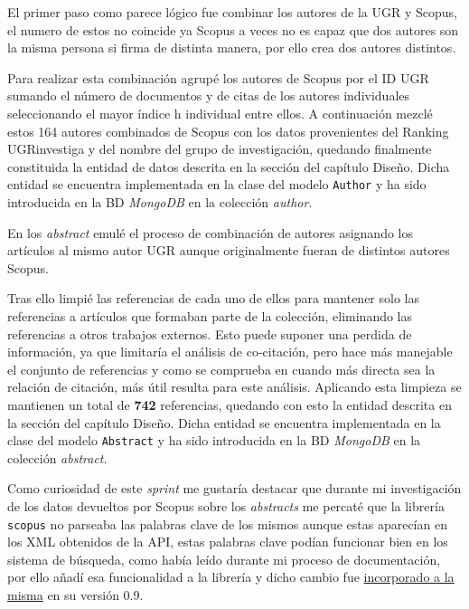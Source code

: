 El primer paso como parece lógico fue combinar los autores de la \acrshort{UGR} y Scopus, el numero de estos no coincide ya Scopus a veces no es capaz que dos autores son la misma persona si firma de distinta manera, por ello crea dos autores distintos.

Para realizar esta combinación agrupé los autores de Scopus por el ID \acrshort{UGR} sumando el número de documentos y de citas de los autores individuales seleccionando el mayor índice h individual entre ellos. A continuación mezclé estos 164 autores combinados de Scopus con los datos provenientes del Ranking UGRinvestiga y del nombre del grupo de investigación, quedando finalmente constituida la entidad de datos descrita en la sección  del capítulo Diseño. Dicha entidad se encuentra implementada en la clase del modelo \texttt{Author} y ha sido introducida en la \acrshort{BD} \textit{MongoDB} en la colección \textit{author}.

En los \textit{abstract} emulé el proceso de combinación de autores asignando los artículos al mismo autor \acrshort{UGR} aunque originalmente fueran de distintos autores Scopus. 

Tras ello limpié las referencias de cada uno de ellos para mantener solo las referencias a artículos que formaban parte de la colección, eliminando las referencias a otros trabajos externos. Esto puede suponer una perdida de información, ya que limitaría el análisis de co-citación, pero hace más manejable el conjunto de referencias y como se comprueba en \cite{DBLP:conf/ecir/SarolLS18} cuando más directa sea la relación de citación, más útil resulta para este análisis. Aplicando esta limpieza se mantienen un total de \textbf{742} referencias, quedando con esto la entidad descrita en la sección  del capítulo Diseño. Dicha entidad se encuentra implementada en la clase del modelo \texttt{Abstract} y ha sido introducida en la \acrshort{BD} \textit{MongoDB} en la colección \textit{abstract}.



Como curiosidad de este \textit{sprint} me gustaría destacar que durante mi investigación de los datos devueltos por Scopus sobre los \textit{abstracts} me percaté que la librería \texttt{scopus} no parseaba las palabras clave de los mismos aunque estas aparecían en los \acrshort{XML} obtenidos de la \acrshort{API}, estas palabras clave podían funcionar bien en los sistema de búsqueda, como había leído durante mi proceso de documentación, por ello añadí esa funcionalidad a la librería y dicho cambio fue \href{https://github.com/scopus-api/scopus/pull/68}{incorporado a la misma} en su versión 0.9.

